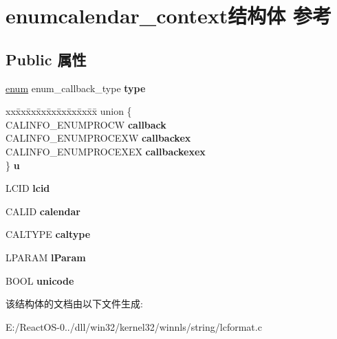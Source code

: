 \hypertarget{structenumcalendar__context}{}\section{enumcalendar\+\_\+context结构体 参考}
\label{structenumcalendar__context}
\subsection*{Public 属性}
\begin{DoxyCompactItemize}
\item 
\mbox{\label{structenumcalendar__context_a8808d656ee6c2fb3fdff47bac27e3233}} 
\hyperlink{interfaceenum}{enum} enum\+\_\+callback\+\_\+type {\bfseries type}
\item 
\mbox{\label{structenumcalendar__context_a9a7eae1d7a8009e3857e5443a0ca1121}} 
\begin{tabbing}
xx\=xx\=xx\=xx\=xx\=xx\=xx\=xx\=xx\=\kill
union \{\\
\>CALINFO\_ENUMPROCW {\bfseries callback}\\
\>CALINFO\_ENUMPROCEXW {\bfseries callbackex}\\
\>CALINFO\_ENUMPROCEXEX {\bfseries callbackexex}\\
\} {\bfseries u}\\

\end{tabbing}\item 
\mbox{\label{structenumcalendar__context_a755bbb83e034024d582f46e84c568b4c}} 
L\+C\+ID {\bfseries lcid}
\item 
\mbox{\label{structenumcalendar__context_aa37639b396a37f6244fc1d72c1ad2550}} 
C\+A\+L\+ID {\bfseries calendar}
\item 
\mbox{\label{structenumcalendar__context_aefb8dec694534a049f3ae7bb8631e356}} 
C\+A\+L\+T\+Y\+PE {\bfseries caltype}
\item 
\mbox{\label{structenumcalendar__context_a81588d206b3a9d4e9d34b03d33596567}} 
L\+P\+A\+R\+AM {\bfseries l\+Param}
\item 
\mbox{\label{structenumcalendar__context_a8d0016756afd9470a82331a6a95670d5}} 
B\+O\+OL {\bfseries unicode}
\end{DoxyCompactItemize}


该结构体的文档由以下文件生成\+:\begin{DoxyCompactItemize}
\item 
E\+:/\+React\+O\+S-\/0../dll/win32/kernel32/winnls/string/lcformat.\+c\end{DoxyCompactItemize}
